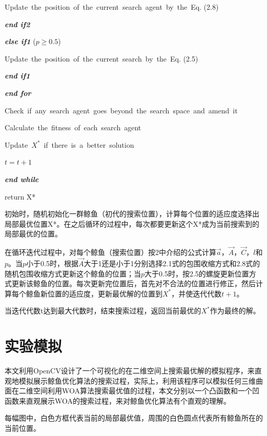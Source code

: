 \documentclass[12pt,a4paper]{article}
\begin{document}
 \qquad \qquad \qquad \qquad Update\ the\ position\ of\ the\ current\ search\ agent\ by\ the\ Eq. (2.8)
 
 \qquad \qquad \qquad \textbf{\emph{end if2}}
 
 \qquad \qquad \textbf{\emph{else if1}} ($p\geq  0.5$)
 
 \qquad \qquad \qquad Update\ the\ position\ of\ the\ current\ search\ by\ the\ Eq. (2.5)
 
 \qquad \qquad \textbf{\emph{end if1}}
 
 \qquad \textbf{\emph{end for}}

 \qquad Check\ if\ any\ search\ agent\ goes\ beyond\ the\ search\ space\ and\ amend\ it
 
 \qquad Calculate\ the\ fitness\ of\ each\ search\ agent
 
 \qquad Update\ $X^{*}$\ if\ there\ is\ a\ better\ solution
 
 \qquad $t=t+1$
 
 \textbf{\emph{end while}}
 
 return X*
 
 初始时，随机初始化一群鲸鱼（初代的搜索位置），计算每个位置的适应度选择出局部最优位置X*。在之后循环的过程中，每次都要更新这个X*成为当前搜索到的局部最优的位置。
 
在循环迭代过程中，对每个鲸鱼（搜索位置）按2中介绍的公式计算$\vec{a}$，$\vec{A}$，$\vec{C}$，$l$和$p$。当$p$小于0.5时，根据$\vec{A}$大于1还是小于1分别选择2.1式的包围收缩方式和2.8式的随机包围收缩方式更新这个鲸鱼的位置；当$p$大于0.5时，按2.5的螺旋更新位置方式更新该鲸鱼的位置。每次更新完位置后，首先对不合法的位置进行修正，然后计算每个鲸鱼新位置的适应度，更新最优解的位置到$X^*$，并使迭代代数$t+1$。

当迭代代数t达到最大代数时，结束搜索过程，返回当前最优的$X^*$作为最终的解。

\section{实验模拟}
本文利用OpenCV设计了一个可视化的在二维空间上搜索最优解的模拟程序，来直观地模拟展示鲸鱼优化算法的搜索过程，实际上，利用该程序可以模拟任何三维曲面在二维空间利用WOA算法搜索最优值的过程，本文分别以一个凸函数和一个凹函数来直观展示WOA的搜索过程，来对鲸鱼优化算法有个直观的理解。

每幅图中，白色方框代表当前的局部最优值，周围的白色圆点代表所有鲸鱼所在的当前位置。
\end{document}
